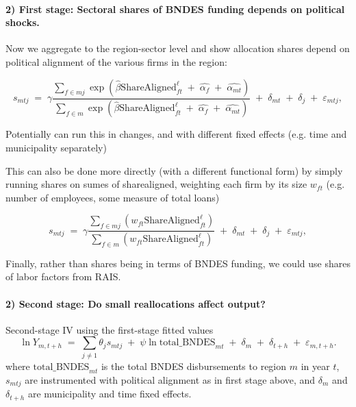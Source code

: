 \documentclass{article}
\begin{document}
\paragraph{2) First stage: Sectoral shares of BNDES funding depends on political shocks.}

Now we aggregate to the region-sector level and show allocation shares depend on political alignment of the various firms in the region:

\begin{equation}
    \label{eq:firststage_emp}
    s_{mtj} \;=\; \gamma \frac{\sum_{f\in mj} \exp(\hat{\beta}\text{ShareAligned}^{\ell}_{ft} \;+\; \hat{\alpha_f} \;+\; \hat{\alpha_{mt}})}{\sum_{f\in m} \exp(\hat{\beta}\text{ShareAligned}^{\ell}_{ft} \;+\; \hat{\alpha_f} \;+\; \hat{\alpha_{mt}})} \;+\; \delta_{mt} \;+\; \delta_{j} \;+\; \varepsilon_{mtj},
\end{equation}

Potentially can run this in changes, and with different fixed effects (e.g. time and municipality separately)

This can also be done more directly (with a different functional form) by simply running shares on sumes of sharealigned, weighting each firm by its size $w_{ft}$ (e.g. number of employees, some measure of total loans)

\begin{equation}
    \label{eq:firststage_emp}
    s_{mtj} \;=\; \gamma \frac{\sum_{f\in mj} (w_{ft} \text{ShareAligned}^{\ell}_{ft})}{\sum_{f\in m} (w_{ft} \text{ShareAligned}^{\ell}_{ft})} \;+\; \delta_{mt} \;+\; \delta_{j} \;+\; \varepsilon_{mtj},
\end{equation}

Finally, rather than shares being in terms of BNDES funding, we could use shares of labor factors from RAIS.


\paragraph{2) Second stage: Do small reallocations affect output?}

Second-stage IV using the first-stage fitted values
\begin{equation}
    \label{eq:secondstage_emp}
    \ln Y_{m,t+h} \;=\; \sum_{j\neq 1} \theta_j s_{mtj} \;+\; \psi \ln \text{total\_BNDES}_{mt} \;+\; \delta_{m} \;+\; \delta_{t+h}  \;+\; \varepsilon_{m,t+h}.
\end{equation}
where $\text{total\_BNDES}_{mt}$ is the total BNDES disbursements to region $m$ in year $t$, $s_{mtj}$ are instrumented with political alignment as in first stage above, and $\delta_{m}$ and $\delta_{t+h}$ are municipality and time fixed effects.
\end{document}
